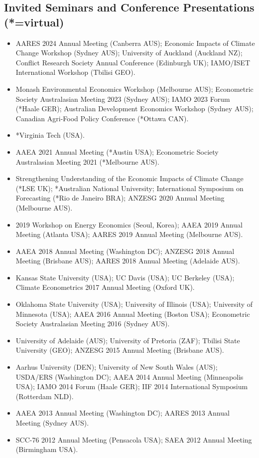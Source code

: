\documentclass[10pt]{article}
\begin{document}
	\subsection*{Invited Seminars and Conference Presentations (*=virtual)}
	\begin{itemize}
		\item {} AARES 2024 Annual Meeting (Canberra AUS); Economic Impacts of Climate Change Workshop (Sydney AUS); University of Auckland (Auckland NZ); Conflict Research Society Annual Conference (Edinburgh UK); IAMO/ISET International Workshop (Tbilisi GEO).
		\item {} Monash Environmental Economics Workshop (Melbourne AUS); Econometric Society Australasian Meeting 2023 (Sydney AUS); IAMO 2023 Forum (*Haale GER); Australian Development Economics Workshop (Sydney AUS); Canadian Agri-Food Policy Conference (*Ottawa CAN).
		\item {} *Virginia Tech (USA).
		\item {} AAEA 2021 Annual Meeting (*Austin USA); Econometric Society Australasian Meeting 2021 (*Melbourne AUS).
		\item {} Strengthening Understanding of the Economic Impacts of Climate Change (*LSE UK); *Australian National University; International Symposium on Forecasting (*Rio de Janeiro BRA); ANZESG 2020 Annual Meeting (Melbourne AUS).
		\item {} 2019 Workshop on Energy Economics (Seoul, Korea); AAEA 2019 Annual Meeting (Atlanta USA); AARES 2019 Annual Meeting (Melbourne AUS).
		\item {} AAEA 2018 Annual Meeting (Washington DC); ANZESG 2018 Annual Meeting (Brisbane AUS); AARES 2018 Annual Meeting (Adelaide AUS).
		\item {} Kansas State University (USA); UC Davis (USA); UC Berkeley (USA); Climate Econometrics 2017 Annual Meeting (Oxford UK).
		\item {} Oklahoma State University (USA); University of Illinois (USA); University of Minnesota (USA); AAEA 2016 Annual Meeting (Boston USA); Econometric Society Australasian Meeting 2016 (Sydney AUS).
		\item {} University of Adelaide (AUS); University of Pretoria (ZAF); Tbilisi State University (GEO); ANZESG 2015 Annual Meeting (Brisbane AUS).
		\item {} Aarhus University (DEN); University of New South Wales (AUS); USDA/ERS (Washington DC); AAEA 2014 Annual Meeting (Minneapolis USA); IAMO 2014 Forum (Haale GER); IIF 2014 International Symposium (Rotterdam NLD).
		\item {} AAEA 2013 Annual Meeting (Washington DC); AARES 2013 Annual Meeting (Sydney AUS).
		\item {} SCC-76 2012 Annual Meeting (Pensacola USA); SAEA 2012 Annual Meeting (Birmingham USA).
	\end{itemize}
	
\end{document}
